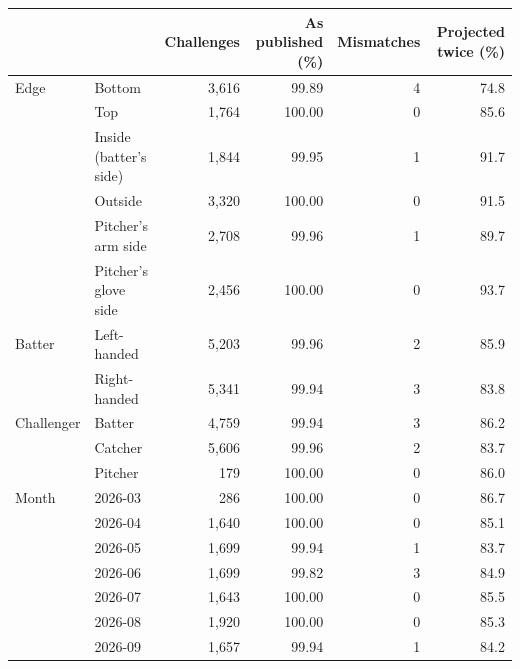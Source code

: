 \begin{tabular}{llrrrr}
\toprule
& & Challenges & As published (\%) & Mismatches & Projected twice (\%) \\
\midrule
Edge & Bottom & 3{,}616 & 99.89 & 4 & 74.8 \\
 & Top & 1{,}764 & 100.00 & 0 & 85.6 \\
 & Inside (batter's side) & 1{,}844 & 99.95 & 1 & 91.7 \\
 & Outside & 3{,}320 & 100.00 & 0 & 91.5 \\
\addlinespace
 & Pitcher's arm side & 2{,}708 & 99.96 & 1 & 89.7 \\
 & Pitcher's glove side & 2{,}456 & 100.00 & 0 & 93.7 \\
\addlinespace
Batter & Left-handed & 5{,}203 & 99.96 & 2 & 85.9 \\
 & Right-handed & 5{,}341 & 99.94 & 3 & 83.8 \\
\addlinespace
Challenger & Batter & 4{,}759 & 99.94 & 3 & 86.2 \\
 & Catcher & 5{,}606 & 99.96 & 2 & 83.7 \\
 & Pitcher & 179 & 100.00 & 0 & 86.0 \\
\addlinespace
Month & 2026-03 & 286 & 100.00 & 0 & 86.7 \\
 & 2026-04 & 1{,}640 & 100.00 & 0 & 85.1 \\
 & 2026-05 & 1{,}699 & 99.94 & 1 & 83.7 \\
 & 2026-06 & 1{,}699 & 99.82 & 3 & 84.9 \\
 & 2026-07 & 1{,}643 & 100.00 & 0 & 85.5 \\
 & 2026-08 & 1{,}920 & 100.00 & 0 & 85.3 \\
 & 2026-09 & 1{,}657 & 99.94 & 1 & 84.2 \\
\bottomrule
\end{tabular}
